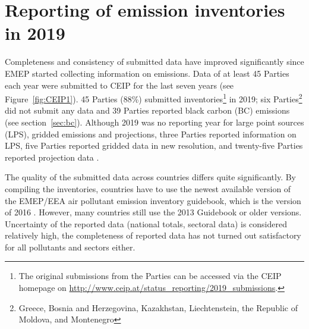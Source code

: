 \section{Reporting of emission inventories in 2019}

Completeness and consistency of submitted data have improved significantly since EMEP started collecting information on emissions. Data of at least 45 Parties each year were submitted to CEIP for the last seven years (see Figure~\ref{fig:CEIP1}). 45 Parties (88\%) submitted inventories\footnote{The original submissions from the Parties can be accessed via the CEIP homepage on \url{http://www.ceip.at/status_reporting/2019_submissions}.} in 2019; six Parties\footnote{Greece, Bosnia and Herzegovina, Kazakhstan, Liechtenstein, the Republic of Moldova, and Montenegro} did not submit any data and 39 Parties reported black carbon (BC) emissions (see section~\ref{sec:bc}). Although 2019 was no reporting year for large point sources (LPS), gridded emissions and projections, three Parties reported information on LPS, five Parties reported gridded data in new resolution, and twenty-five Parties reported projection data \citep{CEIP2019}.

The quality of the submitted data across countries differs quite significantly. By compiling the inventories, countries have to use the newest available version of the EMEP/EEA air pollutant emission inventory guidebook, which is the version of 2016 \citep{EmisInvGuide2016}. However, many countries still use the 2013 Guidebook \citep{EmisInvGuide2013} or older versions. Uncertainty of the reported data (national totals, sectoral data) is considered relatively high, the completeness of reported data has not turned out satisfactory for all pollutants and sectors either.


